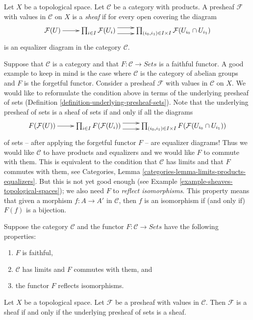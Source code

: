 \begin{definition}
\label{definition-sheaf-values-in-category}
Let $X$ be a topological space. Let $\mathcal{C}$ be
a category with products. A presheaf $\mathcal{F}$ with
values in $\mathcal{C}$ on $X$ is a {\it sheaf}
if for every open covering the diagram
$$
\xymatrix{
\mathcal{F}(U) \ar[r]
&
\prod\nolimits_{i\in I}
\mathcal{F}(U_i)
\ar@<1ex>[r] \ar@<-1ex>[r]
&
\prod\nolimits_{(i_0, i_1) \in I\times I}
\mathcal{F}(U_{i_0} \cap U_{i_1})
}
$$
is an equalizer diagram in the category $\mathcal{C}$.
\end{definition}

\noindent
Suppose that $\mathcal{C}$ is a category and that
$F : \mathcal{C} \to \textit{Sets}$ is a faithful functor.
A good example to keep in mind is the case where $\mathcal{C}$
is the category of abelian groups and $F$ is the forgetful functor.
Consider a presheaf $\mathcal{F}$ with values in $\mathcal{C}$ on $X$.
We would like to reformulate the condition above in terms
of the underlying presheaf of sets
(Definition \ref{definition-underlying-presheaf-sets}).
Note that the underlying
presheaf of sets is a sheaf of sets if and only if all the
diagrams
$$
\xymatrix{
F(\mathcal{F}(U)) \ar[r]
&
\prod\nolimits_{i\in I}
F(\mathcal{F}(U_i))
\ar@<1ex>[r] \ar@<-1ex>[r]
&
\prod\nolimits_{(i_0, i_1) \in I\times I}
F(\mathcal{F}(U_{i_0} \cap U_{i_1}))
}
$$
of sets -- after applying the forgetful functor $F$ -- are
equalizer diagrams! Thus we would like $\mathcal{C}$ to have
products and equalizers and we would like $F$ to commute with
them. This is equivalent to the condition that $\mathcal{C}$
has limits and that $F$ commutes with them, see
Categories, Lemma \ref{categories-lemma-limits-products-equalizers}.
But this is not yet good enough
(see Example \ref{example-sheaves-topological-spaces});
we also need $F$ to {\it reflect isomorphisms}.
This property means that given a morphism
$f : A \to A'$ in $\mathcal{C}$, then $f$ is
an isomorphism if (and only if) $F(f)$ is a bijection.

\begin{lemma}
\label{lemma-sheaves-structure}
Suppose the category $\mathcal{C}$ and
the functor $F : \mathcal{C} \to \textit{Sets}$
have the following properties:
\begin{enumerate}
\item $F$ is faithful,
\item $\mathcal{C}$ has limits and $F$ commutes with them, and
\item the functor $F$ reflects isomorphisms.
\end{enumerate}
Let $X$ be a topological space. Let $\mathcal{F}$
be a presheaf with values in $\mathcal{C}$.
Then $\mathcal{F}$ is a sheaf if and only if the
underlying presheaf of sets is a sheaf.
\end{lemma}

